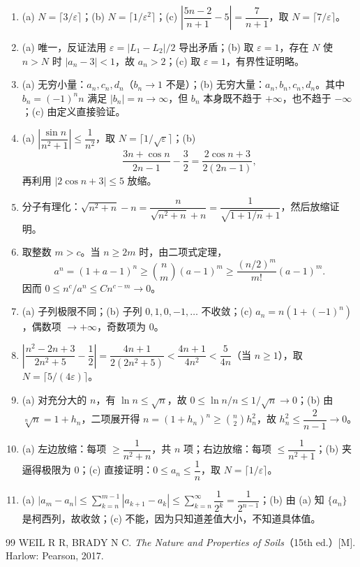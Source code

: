 \documentclass[fontset=fandol]{ctexart}
\begin{document}
\begin{enumerate}
\item[(1)] 
   (a) \(N = \lceil 3/\varepsilon \rceil\)；(b) \(N = \lceil 1/\varepsilon^2 \rceil\)；(c) \(\left|\dfrac{5n-2}{n+1} - 5\right| = \dfrac{7}{n+1}\)，取 \(N = \lceil 7/\varepsilon \rceil\)。

\item[(2)] 
   (a) 唯一，反证法用 \(\varepsilon = |L_1 - L_2|/2\) 导出矛盾；(b) 取 \(\varepsilon = 1\)，存在 \(N\) 使 \(n > N\) 时 \(|a_n-3|<1\)，故 \(a_n > 2\)；(c) 取 \(\varepsilon=1\)，有界性证明略。

\item[(3)] 
   (a) 无穷小量：\(a_n, c_n, d_n\)（\(b_n \to 1\) 不是）；(b) 无穷大量：\(a_n,b_n,c_n,d_n\)。其中 \(b_n=(-1)^n n\) 满足 \(|b_n|=n\to\infty\)，但 \(b_n\) 本身既不趋于 \(+\infty\)，也不趋于 \(-\infty\)；(c) 由定义直接验证。

\item[(4)] 
   (a) \(\left|\dfrac{\sin n}{n^2+1}\right| \leq \dfrac{1}{n^2}\)，取 \(N = \lceil 1/\sqrt{\varepsilon} \rceil\)；(b)
   \[
   \frac{3n+\cos n}{2n-1}-\frac32
   =\frac{2\cos n+3}{2(2n-1)},
   \]
   再利用 \(|2\cos n+3|\leq5\) 放缩。

\item[(5)] 
   分子有理化：\(\sqrt{n^2+n} - n = \dfrac{n}{\sqrt{n^2+n}+n} = \dfrac{1}{\sqrt{1+1/n}+1}\)，然后放缩证明。

\item[(6)] 
   取整数 \(m>c\)。当 \(n\geq2m\) 时，由二项式定理，
   \[
   a^n=(1+a-1)^n\geq\binom{n}{m}(a-1)^m
   \geq\frac{(n/2)^m}{m!}(a-1)^m.
   \]
   因而 \(0\leq n^c/a^n\leq Cn^{c-m}\to0\)。

\item[(7)] 
   (a) 子列极限不同；(b) 子列 \(0,1,0,-1,\dots\) 不收敛；(c) \(a_n = n(1+(-1)^n)\)，偶数项 \(\to +\infty\)，奇数项为 0。

\item[(8)] 
   \(\left|\dfrac{n^2-2n+3}{2n^2+5} - \dfrac{1}{2}\right| = \dfrac{4n+1}{2(2n^2+5)} < \dfrac{4n+1}{4n^2} < \dfrac{5}{4n}\)（当 \(n \geq 1\)），取 \(N = \lceil 5/(4\varepsilon) \rceil\)。

\item[(9)] 
   (a) 对充分大的 \(n\)，有 \(\ln n\leq\sqrt n\)，故 \(0\leq \ln n/n\leq1/\sqrt n\to0\)；(b) 由 \(\sqrt[n]{n}=1+h_n\)，二项展开得 \(n=(1+h_n)^n\geq\binom{n}{2}h_n^2\)，故 \(h_n^2\leq\dfrac{2}{n-1}\to0\)。

\item[(10)] 
   (a) 左边放缩：每项 \(\geq \dfrac{1}{n^2+n}\)，共 \(n\) 项；右边放缩：每项 \(\leq \dfrac{1}{n^2+1}\)；(b) 夹逼得极限为 0；(c) 直接证明：\(0 \leq a_n \leq \dfrac{1}{n}\)，取 \(N = \lceil 1/\varepsilon \rceil\)。

\item[(11)] 
   (a) \(|a_m - a_n| \leq \sum_{k=n}^{m-1} |a_{k+1}-a_k| \leq \sum_{k=n}^{\infty} \dfrac{1}{2^k} = \dfrac{1}{2^{n-1}}\)；(b) 由 (a) 知 \(\{a_n\}\) 是柯西列，故收敛；(c) 不能，因为只知道差值大小，不知道具体值。
\end{enumerate}
\fi

\clearpage


\begin{thebibliography}{99}
 WEIL R R, BRADY N C. \emph{The Nature and Properties of Soils}（15th ed.）[M]. Harlow: Pearson, 2017.
\end{thebibliography}
\end{document}
